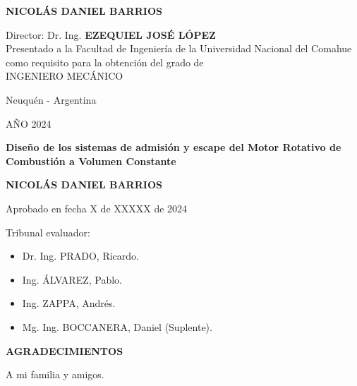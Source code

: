 \documentclass[oneside,a4paper,spanish,links,11pt]{book}
\begin{document}
\begin{center}
\vspace{4cm}

\large{\textbf{
NICOLÁS DANIEL BARRIOS\\
}}

\vspace{4cm}
Director: Dr. Ing. \textbf{EZEQUIEL JOSÉ LÓPEZ}\\


\vspace{3cm}
Presentado a la Facultad de Ingeniería de la Universidad Nacional del Comahue como requisito para la obtención del grado de \\ INGENIERO MECÁNICO

\vfill
Neuquén - Argentina

AÑO 2024

\newpage
\thispagestyle{plain}

\Large\textbf{{Diseño de los sistemas de admisión y escape del Motor Rotativo de Combustión a Volumen Constante \\}}


\vspace{3cm}

\large{\textbf{
NICOLÁS DANIEL BARRIOS
}}\\
\vspace{3cm}
\end{center}

Aprobado en fecha X de XXXXX de 2024


\vspace{2cm}

Tribunal evaluador:

\begin{itemize}

\item Dr. Ing. PRADO, Ricardo. %
\item Ing. ÁLVAREZ, Pablo. %
\item Ing. ZAPPA, Andrés. %
\item Mg. Ing. BOCCANERA, Daniel (Suplente). %

\end{itemize}

\newpage
\thispagestyle{plain}

\begin{center}

\textbf{AGRADECIMIENTOS}\\
\vspace{1cm}

A mi familia y amigos.

\end{center}
\end{document}
